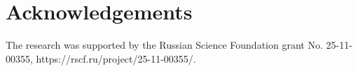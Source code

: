 \section*{Acknowledgements}

The research was supported by the Russian Science Foundation grant No. 25-11-00355, https://rscf.ru/project/25-11-00355/.
